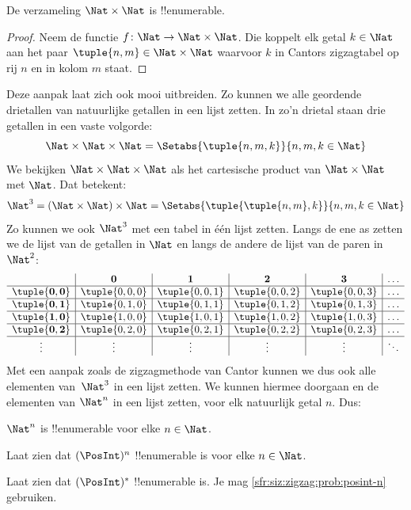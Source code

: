 \documentclass[../../../include/open-logic-section]{subfiles}
\begin{document}
\begin{prop}
De verzameling $\Nat \times \Nat$ is !!{enumerable}.
\end{prop}

\begin{proof}
Neem de functie $f \colon \Nat \to \Nat\times\Nat$. Die koppelt elk getal
$k \in \Nat$ aan het paar $\tuple{n,m} \in \Nat \times \Nat$ waarvoor $k$ in
Cantors zigzagtabel op rij $n$ en in kolom $m$ staat. 
\end{proof}

\begin{explain}
Deze aanpak laat zich ook mooi uitbreiden. Zo kunnen we alle geordende
drietallen van natuurlijke getallen in een lijst zetten. In zo'n drietal staan
drie getallen in een vaste volgorde:
\[
\Nat \times \Nat \times \Nat = \Setabs{\tuple{n,m,k}}{n,m,k \in \Nat}
\]
We bekijken $\Nat \times \Nat \times \Nat$ als het cartesische product van
$\Nat \times \Nat$ met $\Nat$. Dat betekent:
\[
\Nat^3 = (\Nat \times \Nat) \times \Nat =
\Setabs{\tuple{\tuple{n,m},k}}{n, m, k
  \in \Nat }
\]
Zo kunnen we ook $\Nat^3$ met een tabel in één lijst zetten. Langs de ene as
zetten we de lijst van de getallen in $\Nat$ en langs de andere de lijst van de
paren in $\Nat^2$:
\[
\begin{array}{ c | c | c | c | c | c}
& \mathbf 0 & \mathbf 1 & \mathbf 2 & \mathbf 3 & \dots \\
\hline
\mathbf{\tuple{0,0}} & \tuple{0,0,0} & \tuple{0,0,1} & \tuple{0,0,2} & \tuple{0,0,3} & \dots \\
\hline
\mathbf{\tuple{0,1}} & \tuple{0,1,0} & \tuple{0,1,1} & \tuple{0,1,2} & \tuple{0,1,3} & \dots \\
\hline
\mathbf{\tuple{1,0}} & \tuple{1,0,0} & \tuple{1,0,1} & \tuple{1,0,2} & \tuple{1,0,3} & \dots \\
\hline
\mathbf{\tuple{0,2}} & \tuple{0,2,0} & \tuple{0,2,1} & \tuple{0,2,2} & \tuple{0,2,3} & \dots\\
\hline
\vdots & \vdots & \vdots & \vdots & \vdots & \ddots \\
\end{array}
\]
Met een aanpak zoals de zigzagmethode van Cantor kunnen we dus ook alle
elementen van~$\Nat^3$ in een lijst zetten. We kunnen hiermee doorgaan en de
elementen van $\Nat^n$ in een lijst zetten, voor elk natuurlijk getal $n$.
Dus:
\end{explain}

\begin{prop}
$\Nat^n$ is !!{enumerable} voor elke $n \in \Nat$.
\end{prop}

\begin{prob}\label{sfr:siz:zigzag:prob:posint-n}
Laat zien dat $(\PosInt)^n$ !!{enumerable} is voor elke $n \in \Nat$.
\end{prob}

\begin{prob}\label{sfr:siz:zigzag:prob:posint-star}
  Laat zien dat $(\PosInt)^*$ !!{enumerable} is. Je mag
  \cref{sfr:siz:zigzag:prob:posint-n} gebruiken.
\end{prob}
\end{document}
